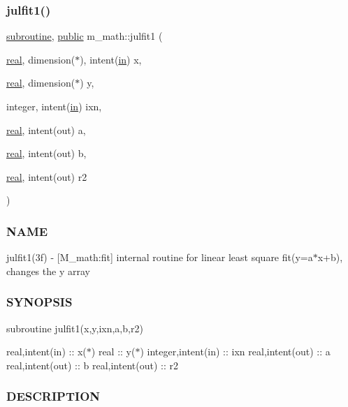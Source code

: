 \subsubsection{\texorpdfstring{julfit1()}{julfit1()}}
{\footnotesize\ttfamily \hyperlink{M__stopwatch_83_8txt_acfbcff50169d691ff02d4a123ed70482}{subroutine}, \hyperlink{M__stopwatch_83_8txt_a2f74811300c361e53b430611a7d1769f}{public} m\+\_\+math\+::julfit1 (\begin{DoxyParamCaption}\item[{\hyperlink{read__watch_83_8txt_abdb62bde002f38ef75f810d3a905a823}{real}, dimension($\ast$), intent(\hyperlink{M__journal_83_8txt_afce72651d1eed785a2132bee863b2f38}{in})}]{x,  }\item[{\hyperlink{read__watch_83_8txt_abdb62bde002f38ef75f810d3a905a823}{real}, dimension($\ast$)}]{y,  }\item[{integer, intent(\hyperlink{M__journal_83_8txt_afce72651d1eed785a2132bee863b2f38}{in})}]{ixn,  }\item[{\hyperlink{read__watch_83_8txt_abdb62bde002f38ef75f810d3a905a823}{real}, intent(out)}]{a,  }\item[{\hyperlink{read__watch_83_8txt_abdb62bde002f38ef75f810d3a905a823}{real}, intent(out)}]{b,  }\item[{\hyperlink{read__watch_83_8txt_abdb62bde002f38ef75f810d3a905a823}{real}, intent(out)}]{r2 }\end{DoxyParamCaption})}



\subsubsection*{N\+A\+ME}

julfit1(3f) -\/ \mbox{[}M\+\_\+math\+:fit\mbox{]} internal routine for linear least square fit(y=a$\ast$x+b), changes the y array \subsubsection*{S\+Y\+N\+O\+P\+S\+IS}

subroutine julfit1(x,y,ixn,a,b,r2)

real,intent(in) \+:\+: x($\ast$) real \+:\+: y($\ast$) integer,intent(in) \+:\+: ixn real,intent(out) \+:\+: a real,intent(out) \+:\+: b real,intent(out) \+:\+: r2 \subsubsection*{D\+E\+S\+C\+R\+I\+P\+T\+I\+ON}

